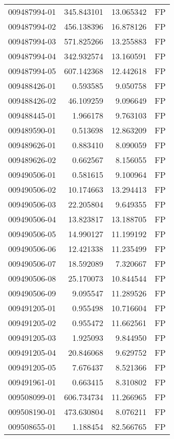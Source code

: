 \begin{tabular}{lrrl}
009487994-01 &  345.843101 &    13.065342 &   FP \\
009487994-02 &  456.138396 &    16.878126 &   FP \\
009487994-03 &  571.825266 &    13.255883 &   FP \\
009487994-04 &  342.932574 &    13.160591 &   FP \\
009487994-05 &  607.142368 &    12.442618 &   FP \\
009488426-01 &    0.593585 &     9.050758 &   FP \\
009488426-02 &   46.109259 &     9.096649 &   FP \\
009488445-01 &    1.966178 &     9.763103 &   FP \\
009489590-01 &    0.513698 &    12.863209 &   FP \\
009489626-01 &    0.883410 &     8.090059 &   FP \\
009489626-02 &    0.662567 &     8.156055 &   FP \\
009490506-01 &    0.581615 &     9.100964 &   FP \\
009490506-02 &   10.174663 &    13.294413 &   FP \\
009490506-03 &   22.205804 &     9.649355 &   FP \\
009490506-04 &   13.823817 &    13.188705 &   FP \\
009490506-05 &   14.990127 &    11.199192 &   FP \\
009490506-06 &   12.421338 &    11.235499 &   FP \\
009490506-07 &   18.592089 &     7.320667 &   FP \\
009490506-08 &   25.170073 &    10.844544 &   FP \\
009490506-09 &    9.095547 &    11.289526 &   FP \\
009491205-01 &    0.955498 &    10.716604 &   FP \\
009491205-02 &    0.955472 &    11.662561 &   FP \\
009491205-03 &    1.925093 &     9.844950 &   FP \\
009491205-04 &   20.846068 &     9.629752 &   FP \\
009491205-05 &    7.676437 &     8.521366 &   FP \\
009491961-01 &    0.663415 &     8.310802 &   FP \\
009508099-01 &  606.734734 &    11.266965 &   FP \\
009508190-01 &  473.630804 &     8.076211 &   FP \\
009508655-01 &    1.188454 &    82.566765 &   FP \\

\end{tabular}
